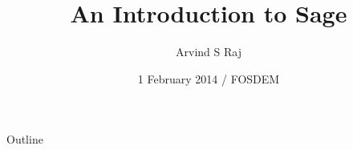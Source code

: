 \documentclass{beamer}
\title{An Introduction to Sage}
\author[Arvind]
{Arvind S Raj}
\institute[Amrita]
{
  Department of Cybersecurity Systems and Networks\\
  Amrita University, India
}
\date[FOSDEM 2014]
{1 February 2014 / FOSDEM}
\begin{document}
\begin{frame}
  \titlepage
\end{frame}

\begin{frame}{Outline}
  \tableofcontents
\end{frame}
\end{document}
